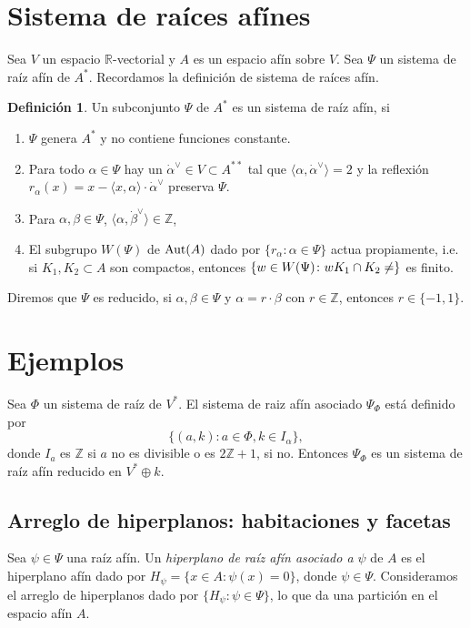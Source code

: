 \documentclass[oneside,12pt]{amsart}
\theoremstyle{definition}
\newtheorem{defi}[theorem]{Definición}
\numberwithin{equation}{section}
\begin{document}
 \section{Sistema de ra\'ices af\'ines } Sea $V$ un espacio $\mathbb{R}$-vectorial y $A$ es un espacio afín sobre $V$.  Sea $\Psi$ un sistema de ra\'iz af\'in de $A^*$.  Recordamos la definición de sistema de raíces afín.

 \begin{defi}
    Un subconjunto $\Psi$ de $A^*$ es un sistema de raíz afín, si
    \begin{enumerate}
        \item $\Psi$ genera $A^*$ y no contiene funciones constante.
        \item Para todo $\alpha\in\Psi$ hay un $\dot{\alpha}^\vee\in V\subset A^{**}$ tal que $\langle\alpha,\dot{\alpha}^\vee \rangle=2$ y la reflexi\'on $r_\alpha(x)=x-\langle x,\alpha \rangle\cdot \dot{\alpha}^\vee$ preserva $\Psi$.
        \item Para $\alpha,\beta\in \Psi$, $\langle\alpha,\dot{\beta}^\vee \rangle\in \mathbb Z$,
        \item El subgrupo $W(\Psi)$ de ${\rm Aut}(A)$ dado por $\{r_\alpha\colon \alpha\in \Psi\}$ actua propiamente, i.e. si $K_1,K_2\subset A$ son compactos, entonces $\{w\in W(\Psi)\colon wK_1\cap K_2\neq\empty\}$ es finito.
    \end{enumerate}
    Diremos que $\Psi$ es reducido, si $\alpha,\beta\in \Psi$ y $\alpha=r\cdot\beta$ con $r\in \mathbb Z$, entonces $r\in\{-1,1\}$.
\end{defi}


\section{Ejemplos}
Sea $\Phi$ un sistema de raíz de $V^*$. El sistema de raiz af\'in asociado $\Psi_\Phi$ est\'a definido por
    \[\{(a,k)\colon a\in \Phi, k\in I_\alpha\},\]
    donde $I_a$ es $\mathbb Z$ si $a$ no es divisible o es $2\mathbb Z+1$, si no.
    Entonces $\Psi_\Phi$ es un sistema de raíz afín reducido en $V^*\oplus k$.

    \subsection{Arreglo de hiperplanos: habitaciones y facetas} Sea $\psi\in \Psi$ una ra\'iz af\'in.
    Un \textit{hiperplano de ra\'iz afín asociado a $\psi$} de $A$ es el hiperplano af\'in dado por $H_\psi = \{x \in A: \psi(x) = 0\}$, donde $\psi \in \Psi$. Consideramos el arreglo de hiperplanos dado por $\{H_\psi\colon \psi\in \Psi\}$, lo que da una partici\'on en el espacio af\'in $A$.
    
\end{document}
